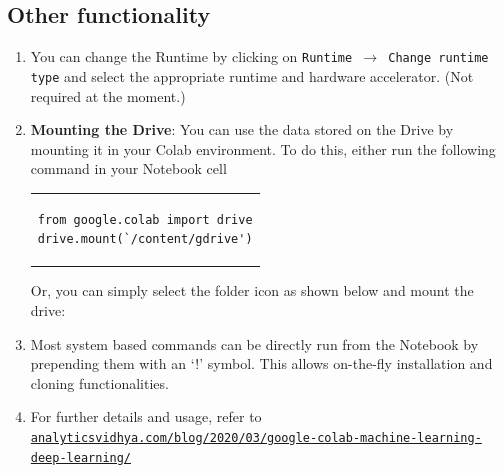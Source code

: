 \documentclass[a4paper,10pt]{article}
\begin{document}
\subsection{Other functionality}
\begin{enumerate}
    \item You can change the Runtime by clicking on \texttt{Runtime $\rightarrow$ Change runtime type} and select the appropriate runtime and hardware accelerator. (Not required at the moment.)
    
    \item \textbf{Mounting the Drive}: You can use the data stored on the Drive by mounting it in your Colab environment. To do this, either run the following command in your Notebook cell
    
\begin{center}
\begin{tabular}{l}
\begin{lstlisting}[linewidth=6.5cm]
from google.colab import drive
drive.mount(`/content/gdrive')
\end{lstlisting}
\end{tabular}
\end{center}
    
    Or, you can simply select the folder icon as shown below and mount the drive:
    
    \begin{center}
    \end{center}
    
    \newpage
    \item Most system based commands can be directly run from the Notebook by prepending them with an `!' symbol. This allows on-the-fly installation and cloning functionalities.
    
\begin{center}
\end{center}
    
    \item For further details and usage, refer to \\
    \small \href{https://www.analyticsvidhya.com/blog/2020/03/google-colab-machine-learning-deep-learning/}{\nolinkurl{analyticsvidhya.com/blog/2020/03/google-colab-machine-learning-deep-learning/}}
\end{enumerate}
\end{document}
